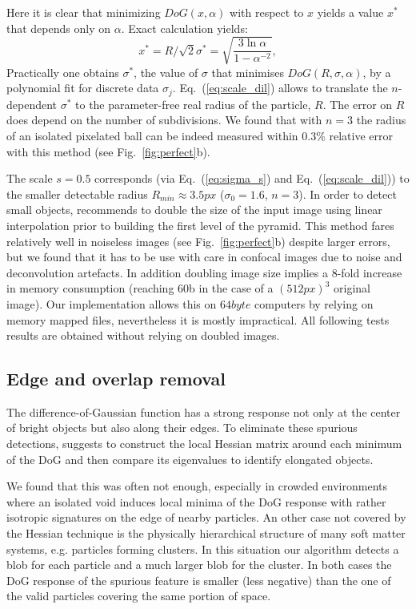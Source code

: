\documentclass[8.5pt,twoside,twocolumn]{article}
\begin{document}
Here it is clear that minimizing $DoG(x, \alpha)$ with respect to $x$ yields a value $x^*$ that depends only on $\alpha$. Exact calculation yields:
\begin{equation}
	x^* = R/\sqrt{2}\sigma^* = \sqrt{\frac{3\ln \alpha}{1-\alpha^{-2}}}, 
	\label{eq:scale_dil}
\end{equation}
Practically one obtains $\sigma^*$, the value of $\sigma$ that minimises $DoG(R,\sigma, \alpha)$, by a polynomial fit for discrete data $\sigma_j$. Eq.~(\ref{eq:scale_dil}) allows to translate the $n$-dependent $\sigma^*$ to the parameter-free real radius of the particle, $R$. The error on $R$ does depend on the number of subdivisions. We found that with $n=3$ the radius of an isolated pixelated ball can be indeed measured within $0.3\%$ relative error with this method (see Fig.~\ref{fig:perfect}b).

The scale $s=0.5$ corresponds (via Eq.~(\ref{eq:sigma_s}) and Eq.~(\ref{eq:scale_dil})) to the smaller detectable radius $R_{min}\approx \unit{3.5}{px}$ ($\sigma_0=1.6$, $n=3$). In order to detect small objects, \citet{Lowe2004} recommends to double the size of the input image using linear interpolation prior to building the first level of the pyramid. This method fares relatively well in noiseless images (see Fig.~\ref{fig:perfect}b) despite larger errors, but we found that it has to be use with care in confocal images due to noise and deconvolution artefacts. In addition doubling image size implies a 8-fold increase in memory consumption (reaching \unit{60}{\giga b} in the case of a $(\unit{512}{px})^3$ original image). Our implementation allows this on $\unit{64}{byte}$ computers by relying on memory mapped files, nevertheless it is mostly impractical. All following tests results are obtained without relying on doubled images.

\subsection{Edge and overlap removal}

The difference-of-Gaussian function has a strong response not only at the center of bright objects but also along their edges. To eliminate these spurious detections, \citet{Lowe2004} suggests to construct the local Hessian matrix around each minimum of the DoG and then compare its eigenvalues to identify elongated objects.

We found that this was often not enough, especially in crowded environments where an isolated void induces local minima of the DoG response with rather isotropic signatures on the edge of nearby particles. An other case not covered by the Hessian technique is the physically hierarchical structure of many soft matter systems, e.g. particles forming clusters. In this situation our algorithm detects a blob for each particle and a much larger blob for the cluster. In both cases the DoG response of the spurious feature is smaller (less negative) than the one of the valid particles covering the same portion of space. 
\end{document}
